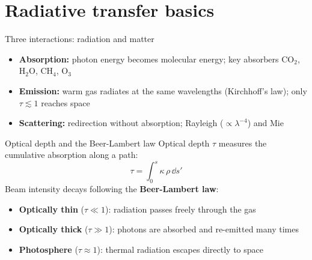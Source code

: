 \documentclass[aspectratio=169, 11pt]{beamer}
\begin{document}
\section{Radiative transfer basics}

\begin{frame}{Three interactions: radiation and matter}
  \begin{itemize}\setlength\itemsep{6pt}
    \item \textbf{Absorption:} photon energy becomes molecular energy; key absorbers $\mathrm{CO_2}$, $\mathrm{H_2O}$, $\mathrm{CH_4}$, $\mathrm{O_3}$
    \item \textbf{Emission:} warm gas radiates at the same wavelengths (Kirchhoff's law); only $\tau \lesssim 1$ reaches space
    \item \textbf{Scattering:} redirection without absorption; Rayleigh ($\propto \lambda^{-4}$) and Mie
  \end{itemize}
\end{frame}

\begin{frame}
\end{frame}

\begin{frame}
\end{frame}

\begin{frame}{Optical depth and the Beer-Lambert law}
  Optical depth $\tau$ measures the cumulative absorption along a path:
  $$\tau = \int_0^s \kappa\,\rho\,\dd s'$$
  \vskip2pt
  Beam intensity decays following the \textbf{Beer-Lambert law}:
  \vskip2pt
  \vskip4pt
  \begin{itemize}
    \item \textbf{Optically thin} ($\tau \ll 1$): radiation passes freely through the gas
    \item \textbf{Optically thick} ($\tau \gg 1$): photons are absorbed and re-emitted many times
    \item \textbf{Photosphere} ($\tau \approx 1$): thermal radiation escapes directly to space
  \end{itemize}
\end{frame}
\end{document}
